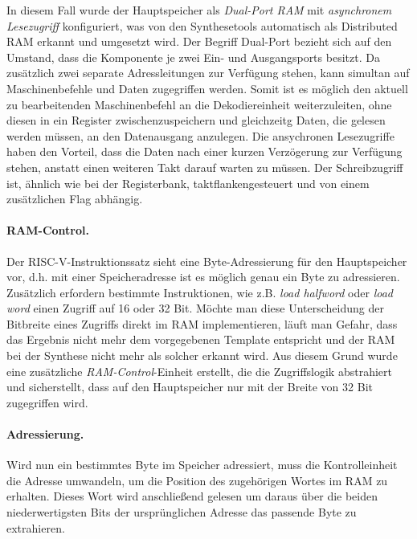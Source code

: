 In diesem Fall wurde der Hauptspeicher als \textit{Dual-Port RAM} mit \textit{asynchronem Lesezugriff} konfiguriert, was von den Synthesetools automatisch als Distributed RAM erkannt und umgesetzt wird.
Der Begriff Dual-Port bezieht sich auf den Umstand, dass die Komponente je zwei Ein- und Ausgangsports besitzt.
Da zusätzlich zwei separate Adressleitungen zur Verfügung stehen, kann simultan auf Maschinenbefehle und Daten zugegriffen werden.
Somit ist es möglich den aktuell zu bearbeitenden Maschinenbefehl an die Dekodiereinheit weiterzuleiten, ohne diesen in ein Register zwischenzuspeichern und gleichzeitg Daten, die gelesen werden müssen, an den Datenausgang anzulegen.
Die ansychronen Lesezugriffe haben den Vorteil, dass die Daten nach einer kurzen Verzögerung zur Verfügung stehen, anstatt einen weiteren Takt darauf warten zu müssen.
Der Schreibzugriff ist, ähnlich wie bei der Registerbank, taktflankengesteuert und von einem zusätzlichen Flag abhängig.

\paragraph{RAM-Control.} Der RISC-V-Instruktionssatz sieht eine Byte-Adressierung für den Hauptspeicher vor, d.h. mit einer Speicheradresse ist es möglich genau ein Byte zu adressieren.
Zusätzlich erfordern bestimmte Instruktionen, wie z.B. \textit{load halfword} oder \textit{load word} einen Zugriff auf 16 oder 32 Bit.
Möchte man diese Unterscheidung der Bitbreite eines Zugriffs direkt im RAM implementieren, läuft man Gefahr, dass das Ergebnis nicht mehr dem vorgegebenen Template entspricht und der RAM bei der Synthese nicht mehr als solcher erkannt wird.
Aus diesem Grund wurde eine zusätzliche \textit{RAM-Control}-Einheit erstellt, die die Zugriffslogik abstrahiert und sicherstellt, dass auf den Hauptspeicher nur mit der Breite von 32 Bit zugegriffen wird.

\paragraph{Adressierung.} Wird nun ein bestimmtes Byte im Speicher adressiert, muss die Kontrolleinheit die Adresse umwandeln, um die Position des zugehörigen Wortes im RAM zu erhalten. 
Dieses Wort wird anschließend gelesen um daraus über die beiden niederwertigsten Bits der ursprünglichen Adresse das passende Byte zu extrahieren.

